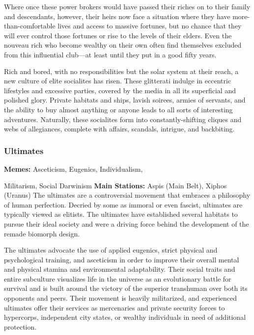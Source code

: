 Where once these power brokers would have 
passed their riches on to their family and descendants, 
however, their heirs now face a situation where they 
have more-than-comfortable lives and access to massive fortunes, but no chance that they will ever control 
those fortunes or rise to the levels of their elders. Even 
the nouveau rich who become wealthy on their own 
often find themselves excluded from this influential 
club—at least until they put in a good fifty years.

Rich and bored, with no responsibilities but the 
solar system at their reach, a new culture of elite socialites has risen. These glitterati indulge in eccentric 
lifestyles and excessive parties, covered by the media 
in all its superficial and polished glory. Private habitats 
and ships, lavish soirees, armies of servants, and the 
ability to buy almost anything or anyone leads to all 
sorts of interesting adventures. Naturally, these socialites form into constantly-shifting cliques and webs of 
allegiances, complete with affairs, scandals, intrigue, 
and backbiting.

\subsubsection{Ultimates}

\textbf{Memes:} Asceticism, Eugenics, Individualism, 

Militarism, Social Darwinism
\textbf{Main Stations:} Aspis (Main Belt), Xiphos (Uranus)
The ultimates are a controversial movement that 
embraces a philosophy of human perfection. Decried 
by some as immoral or even fascist, ultimates are typically viewed as elitists. The ultimates have established 
several habitats to pursue their ideal society and were 
a driving force behind the development of the remade 
biomorph design.

The ultimates advocate the use of applied eugenics, strict physical and psychological training, and 
asceticism in order to improve their overall mental 
and physical stamina and environmental adaptability. Their social traits and entire subculture visualizes life in the universe as an evolutionary battle 
for survival and is built around the victory of the 
superior transhuman over both its opponents and 
peers. Their movement is heavily militarized, and 
experienced ultimates offer their services as mercenaries and private security forces to hypercorps, 
independent city states, or wealthy individuals in 
need of additional protection.

